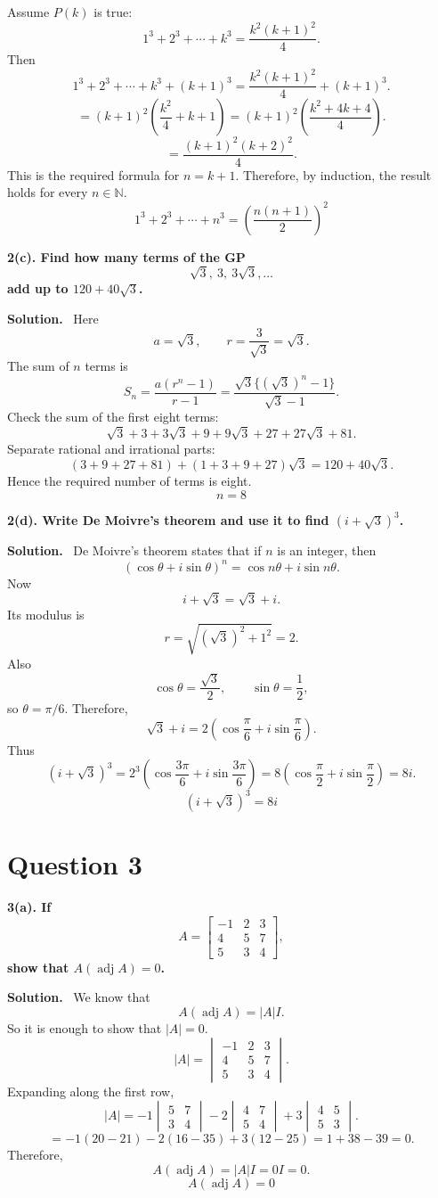 \documentclass[11pt,a4paper]{article}
\newcommand{\question}[1]{\vspace{4pt}\begin{tcolorbox}[colback=softblue,colframe=headblue,boxrule=0.6pt,arc=2pt,left=5pt,right=5pt,top=4pt,bottom=4pt]\textbf{#1}\end{tcolorbox}}
\newcommand{\answer}{\textbf{Solution.}~}
\newcommand{\finalans}[1]{\[\boxed{#1}\]}
\begin{document}
Assume $P(k)$ is true:
\[
1^3+2^3+\cdots+k^3=\frac{k^2(k+1)^2}{4}.
\]
Then
\[
1^3+2^3+\cdots+k^3+(k+1)^3
=\frac{k^2(k+1)^2}{4}+(k+1)^3.
\]
\[
=(k+1)^2\left(\frac{k^2}{4}+k+1\right)
=(k+1)^2\left(\frac{k^2+4k+4}{4}\right).
\]
\[
=\frac{(k+1)^2(k+2)^2}{4}.
\]
This is the required formula for $n=k+1$. Therefore, by induction, the result holds for every $n\in\mathbb N$.
\finalans{1^3+2^3+\cdots+n^3=\left(\frac{n(n+1)}{2}\right)^2}

\question{2(c). Find how many terms of the GP
\[
\sqrt3,\ 3,\ 3\sqrt3,\ldots
\]
add up to $120+40\sqrt3$.}
\answer
Here
\[
a=\sqrt3,
\qquad r=\frac{3}{\sqrt3}=\sqrt3.
\]
The sum of $n$ terms is
\[
S_n=\frac{a(r^n-1)}{r-1}
=\frac{\sqrt3\{(\sqrt3)^n-1\}}{\sqrt3-1}.
\]
Check the sum of the first eight terms:
\[
\sqrt3+3+3\sqrt3+9+9\sqrt3+27+27\sqrt3+81.
\]
Separate rational and irrational parts:
\[
(3+9+27+81)+(1+3+9+27)\sqrt3=120+40\sqrt3.
\]
Hence the required number of terms is eight.
\finalans{n=8}

\question{2(d). Write De Moivre's theorem and use it to find $(i+\sqrt3)^3$.}
\answer
De Moivre's theorem states that if $n$ is an integer, then
\[
(\cos\theta+i\sin\theta)^n=\cos n\theta+i\sin n\theta.
\]
Now
\[
i+\sqrt3=\sqrt3+i.
\]
Its modulus is
\[
r=\sqrt{(\sqrt3)^2+1^2}=2.
\]
Also
\[
\cos\theta=\frac{\sqrt3}{2},\qquad \sin\theta=\frac12,
\]
so $\theta=\pi/6$. Therefore,
\[
\sqrt3+i=2\left(\cos\frac{\pi}{6}+i\sin\frac{\pi}{6}\right).
\]
Thus
\[
(i+\sqrt3)^3=2^3\left(\cos\frac{3\pi}{6}+i\sin\frac{3\pi}{6}\right)
=8\left(\cos\frac{\pi}{2}+i\sin\frac{\pi}{2}\right)=8i.
\]
\finalans{(i+\sqrt3)^3=8i}

\section*{Question 3}

\question{3(a). If
\[
A=\begin{bmatrix}-1&2&3\\4&5&7\\5&3&4\end{bmatrix},
\]
show that $A(\operatorname{adj}A)=0$.}
\answer
We know that
\[
A(\operatorname{adj}A)=|A|I.
\]
So it is enough to show that $|A|=0$.
\[
|A|=\begin{vmatrix}-1&2&3\\4&5&7\\5&3&4\end{vmatrix}.
\]
Expanding along the first row,
\[
|A|=-1\begin{vmatrix}5&7\\3&4\end{vmatrix}
-2\begin{vmatrix}4&7\\5&4\end{vmatrix}
+3\begin{vmatrix}4&5\\5&3\end{vmatrix}.
\]
\[
=-1(20-21)-2(16-35)+3(12-25)
=1+38-39=0.
\]
Therefore,
\[
A(\operatorname{adj}A)=|A|I=0I=0.
\]
\finalans{A(\operatorname{adj}A)=0}
\end{document}
